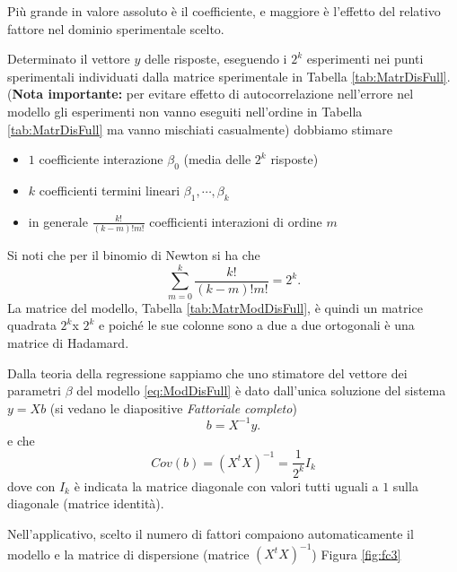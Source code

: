 \documentclass[
  11pt,
]{book}
\providecommand{\tightlist}{%
  \setlength{\itemsep}{0pt}\setlength{\parskip}{0pt}}
\begin{document}
Più grande in valore assoluto è il coefficiente, e maggiore è l'effetto
del relativo fattore nel dominio sperimentale scelto.

Determinato il vettore \(y\) delle risposte, eseguendo i \(2^k\) esperimenti
nei punti sperimentali individuati dalla matrice sperimentale in
Tabella \ref{tab:MatrDisFull}. (\textbf{Nota importante:} per evitare effetto
di autocorrelazione nell'errore nel modello gli esperimenti non vanno
eseguiti nell'ordine in Tabella \ref{tab:MatrDisFull} ma vanno mischiati
casualmente) dobbiamo stimare

\begin{itemize}
\tightlist
\item
  \(1\) coefficiente interazione \(\beta_0\) (media delle \(2^k\) risposte)
\item
  \(k\) coefficienti termini lineari \(\beta_1,\cdots,\beta_k\)
\item
  in generale \(\frac{k!}{(k-m)!m!}\) coefficienti interazioni di ordine \(m\)
\end{itemize}

Si noti che per il binomio di Newton si ha che
\[
\sum_{m=0}^k\frac{k!}{(k-m)!m!}=2^k. 
\]
La matrice del modello, Tabella \ref{tab:MatrModDisFull}, è quindi un matrice
quadrata \(2^k\)x \(2^k\) e poiché le sue colonne sono a due a due
ortogonali è una matrice di Hadamard.

Dalla teoria della regressione sappiamo che uno stimatore del vettore
dei parametri \(\beta\) del modello \eqref{eq:ModDisFull} è dato dall'unica
soluzione del sistema \(y=Xb\) (si vedano le diapositive \emph{Fattoriale
completo})
\[
 b=X^{-1}y.
\]
e che
\[
Cov(b)=(X^tX)^{-1}=\frac{1}{2^k}I_k
\]
dove con \(I_k\) è indicata la matrice diagonale con valori tutti
uguali a \(1\) sulla diagonale (matrice identità).

Nell'applicativo, scelto il numero di fattori compaiono automaticamente
il modello e la matrice di dispersione (matrice \((X^tX)^{-1}\))
Figura \ref{fig:fc3}
\end{document}
